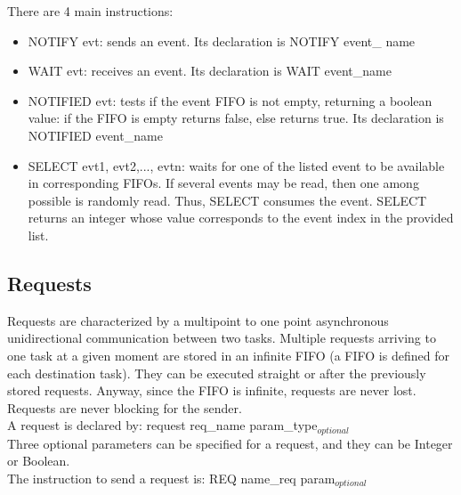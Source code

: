\documentclass[12pt]{article}
\begin{document}
There are 4 main instructions: 

\begin{itemize}

\item NOTIFY evt: sends an event. Its declaration is NOTIFY event\_ name

\item WAIT evt: receives an event. Its declaration is WAIT event\_name

\item NOTIFIED evt: tests if the event FIFO is not empty, returning a boolean value: if the FIFO is empty returns false, else returns true. Its declaration is NOTIFIED event\_name\\

\item SELECT evt1, evt2,..., evtn: waits for one of the listed event to be available in corresponding FIFOs. If several events may be read, then one among possible is randomly read. Thus, SELECT consumes the event. SELECT returns an integer whose value corresponds to the event index in the provided list.
\end{itemize}


\subsection{Requests}

Requests are characterized by a multipoint to one point asynchronous unidirectional communication between two tasks. Multiple requests arriving to one task at a given moment are stored in an infinite FIFO (a FIFO is defined for each destination task). They can be executed straight or after the previously stored requests. Anyway, since the FIFO is infinite, requests are never lost.\\

Requests are never blocking for the sender.\\

A request is declared by: request req\_name param\_type$_{optional}$\\

Three optional parameters can be specified for a request, and they can be Integer or Boolean. \\

The instruction to send a request is: REQ name\_req param$_{optional}$





\newpage
\end{document}
